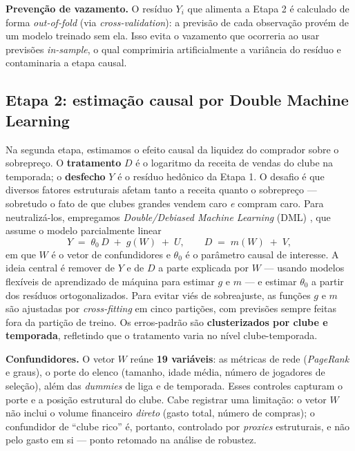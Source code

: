 \documentclass[12pt]{article}
\begin{document}
\textbf{Prevenção de vazamento.} O resíduo $Y_i$ que alimenta a Etapa 2 é calculado de forma
\textit{out-of-fold} (via \textit{cross-validation}): a previsão de cada observação provém de um
modelo treinado sem ela. Isso evita o vazamento que ocorreria ao usar previsões \textit{in-sample},
o qual comprimiria artificialmente a variância do resíduo e contaminaria a etapa causal.

\subsection{Etapa 2: estimação causal por Double Machine Learning}

Na segunda etapa, estimamos o efeito causal da liquidez do comprador sobre o sobrepreço. O
\textbf{tratamento} $D$ é o logaritmo da receita de vendas do clube na temporada; o \textbf{desfecho}
$Y$ é o resíduo hedônico da Etapa 1. O desafio é que diversos fatores estruturais afetam tanto a
receita quanto o sobrepreço — sobretudo o fato de que clubes grandes vendem caro \textit{e} compram
caro. Para neutralizá-los, empregamos \textit{Double/Debiased Machine Learning} (DML)
\cite{chernozhukov2018}, que assume o modelo parcialmente linear
%
\begin{equation}
Y \;=\; \theta_0\, D \;+\; g(W) \;+\; U, \qquad D \;=\; m(W) \;+\; V,
\label{eq:dml}
\end{equation}
%
em que $W$ é o vetor de confundidores e $\theta_0$ é o parâmetro causal de interesse. A ideia central
é remover de $Y$ e de $D$ a parte explicada por $W$ — usando modelos flexíveis de aprendizado de
máquina para estimar $g$ e $m$ — e estimar $\theta_0$ a partir dos resíduos ortogonalizados. Para
evitar viés de sobreajuste, as funções $g$ e $m$ são ajustadas por \textit{cross-fitting} em cinco
partições, com previsões sempre feitas fora da partição de treino. Os erros-padrão são
\textbf{clusterizados por clube e temporada}, refletindo que o tratamento varia no nível
clube-temporada.

\textbf{Confundidores.} O vetor $W$ reúne \textbf{19 variáveis}: as métricas de rede (\textit{PageRank}
e graus), o porte do elenco (tamanho, idade média, número de jogadores de seleção), além das
\textit{dummies} de liga e de temporada. Esses controles capturam o porte e a posição estrutural do
clube. Cabe registrar uma limitação: o vetor $W$ não inclui o volume financeiro \textit{direto}
(gasto total, número de compras); o confundidor de ``clube rico'' é, portanto, controlado por
\textit{proxies} estruturais, e não pelo gasto em si — ponto retomado na análise de robustez.
\end{document}
